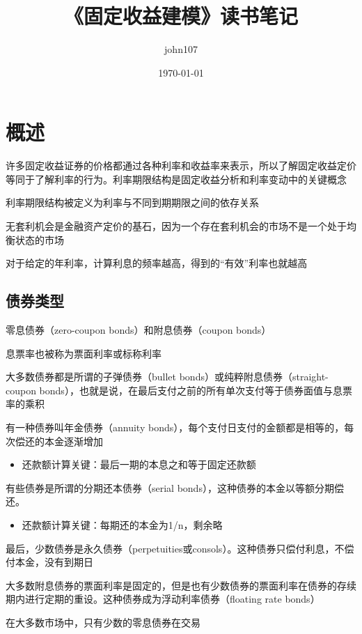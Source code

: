 \documentclass[UTF8]{ctexart}
\title{《固定收益建模》读书笔记}
\author{john107}
\date{\today}
\begin{document}
\maketitle
\clearpage
\tableofcontents
\clearpage

\section{概述}
许多固定收益证券的价格都通过各种利率和收益率来表示，所以了解固定收益定价等同于了解利率的行为。利率期限结构是固定收益分析和利率变动中的关键概念

利率期限结构被定义为利率与不同到期期限之间的依存关系

无套利机会是金融资产定价的基石，因为一个存在套利机会的市场不是一个处于均衡状态的市场

对于给定的年利率，计算利息的频率越高，得到的“有效”利率也就越高

\subsection{债券类型}
零息债券（zero-coupon bonds）和附息债券（coupon bonds）

息票率也被称为票面利率或标称利率

大多数债券都是所谓的子弹债券（bullet bonds）或纯粹附息债券（straight-coupon bonds），也就是说，在最后支付之前的所有单次支付等于债券面值与息票率的乘积

有一种债券叫年金债券（annuity bonds），每个支付日支付的金额都是相等的，每次偿还的本金逐渐增加

\begin{itemize}
\item{还款额计算关键：最后一期的本息之和等于固定还款额}
\end{itemize}

有些债券是所谓的分期还本债券（serial bonds），这种债券的本金以等额分期偿还。

\begin{itemize}
\item{还款额计算关键：每期还的本金为1/n，剩余略}
\end{itemize}

最后，少数债券是永久债券（perpetuities或consols）。这种债券只偿付利息，不偿付本金，没有到期日

大多数附息债券的票面利率是固定的，但是也有少数债券的票面利率在债券的存续期内进行定期的重设。这种债券成为浮动利率债券（floating rate bonds）

在大多数市场中，只有少数的零息债券在交易
\end{document}

